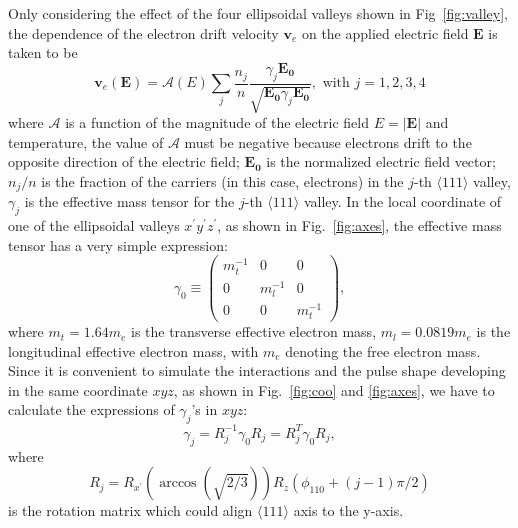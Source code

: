 Only considering the effect of the four ellipsoidal valleys shown in Fig~\ref{fig:valley}, the dependence of the electron drift velocity $\mathbf{v}_{e}$ on the applied electric field $\mathbf{E}$ is taken to be
\begin{equation}
  \label{eq:ed}
  \mathbf{v}_{e}(\mathbf{E}) = \mathcal{A}(E) \sum_{j}     \frac{n_{j}}{n} \frac{\gamma_{j}\mathbf{E_{0}}}           {\sqrt{\mathbf{E_{0}}\gamma_{j}\mathbf{E_{0}}}}, \mbox{ with }           j=1,2,3,4
\end{equation}
where $\mathcal{A}$ is a function of the magnitude of the electric field $E=|\mathbf{E}|$ and temperature, the value of $\mathcal{A}$ must be negative because electrons drift to the opposite direction of the electric field; $\mathbf{E_{0}}$ is the normalized electric field vector; $n_{j}/n$ is the fraction of the carriers (in this case, electrons) in the $j$-th $\langle111\rangle$ valley, $\gamma_{j}$ is the effective mass tensor for the $j$-th $\langle111\rangle$ valley. In the local coordinate of one of the ellipsoidal valleys $x^{\prime}y^{\prime}z^{\prime}$, as shown in Fig.~\ref{fig:axes}, the effective mass tensor has a very simple expression:
\begin{equation}
  \label{eq:gamma0}
  \gamma_{0} \equiv \left(
    \begin{array}{ccc}
      m_{t}^{-1} & 0 & 0 \\
      0 & m_{l}^{-1} & 0 \\
      0 & 0 & m_{t}^{-1}
    \end{array} \right),
\end{equation}
where $m_{t} = 1.64m_{e}$ is the transverse effective electron mass, $m_{l} = 0.0819m_{e}$ is the longitudinal effective electron mass, with $m_{e}$ denoting the free electron mass. Since it is convenient to simulate the interactions and the pulse shape developing in the same coordinate $xyz$, as shown in Fig.~\ref{fig:coo} and \ref{fig:axes}, we have to calculate the expressions of $\gamma_{j}$'s in $xyz$:
\begin{equation}
  \label{eq:gammas}
  \gamma_{j} = R_{j}^{-1}\gamma_{0}R_{j} = R_{j}^{T}\gamma_{0}R_{j},
\end{equation}
where
\begin{equation}
  \label{eq:rs}
  R_{j} = R_{x^{\prime}}(\arccos(\sqrt{2/3}))R_{z}(\phi_{110}+(j-1)\pi/2)
\end{equation}
is the rotation matrix which could align $\langle111\rangle$ axis to the y-axis.

